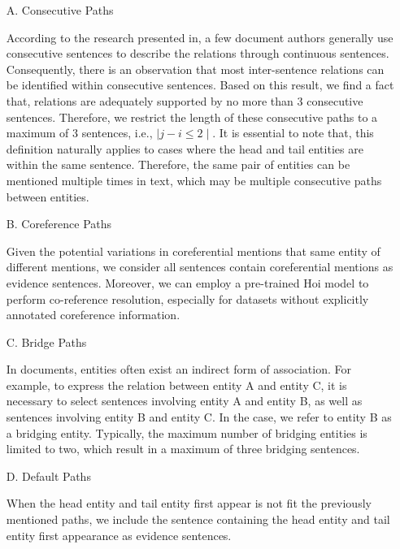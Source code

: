 \documentclass[preprint,12pt]{elsarticle}
\begin{document}
\begin{enumerate}

\item[A.]Consecutive Paths

According to the research presented in\cite{xie-etal-2022-eider}, a few document authors generally use consecutive sentences to describe the relations through continuous sentences. Consequently, there is an observation that most inter-sentence relations can be identified within consecutive sentences. Based on this result, we find a fact that, relations are adequately supported by no more than 3 consecutive sentences. Therefore, we restrict the length of these consecutive paths to a maximum of 3 sentences, i.e., $\mid j-i\le2\mid$. It is essential to note that, this definition naturally applies to cases where the head and tail entities are within the same sentence. Therefore, the same pair of entities can be mentioned multiple times in text, which may be multiple consecutive paths between entities.

\item[B.]Coreference Paths

Given the potential variations in coreferential mentions that same entity of different mentions, we consider all sentences contain coreferential mentions as evidence sentences. Moreover, we can employ a pre-trained Hoi model\cite{xu2021document} to perform co-reference resolution, especially for datasets without explicitly annotated coreference information.
\item[C.]Bridge Paths

In documents, entities often exist an indirect form of association. For example, to express the relation between entity A and entity C, it is necessary to select sentences involving entity A and entity B, as well as sentences involving entity B and entity C. In the case, we refer to entity B as a bridging entity. Typically, the maximum number of bridging entities is limited to two, which result in a maximum of three bridging sentences.
\item[D.]Default Paths

When the head entity and tail entity first appear is not fit the previously mentioned paths, we include the sentence containing the head entity and tail entity first appearance as evidence sentences.
\end{enumerate}
\end{document}
